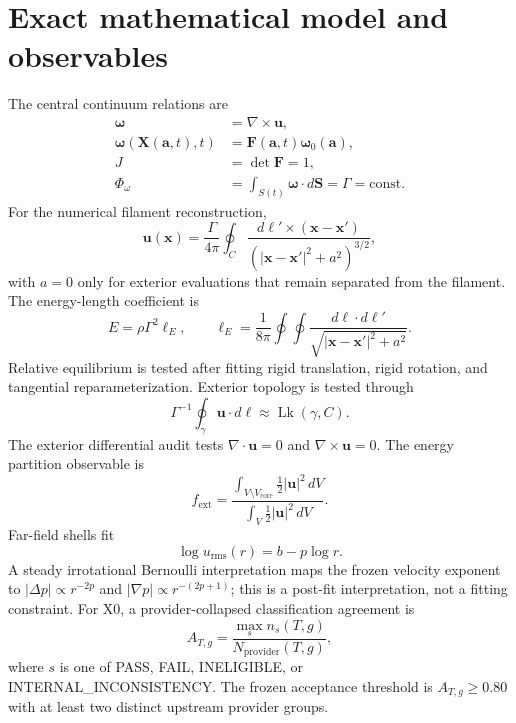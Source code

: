 \documentclass[11pt,a4paper]{article}
\newcommand{\vort}{\boldsymbol{\omega}}
\newcommand{\vel}{\mathbf{u}}
\newcommand{\Fmat}{\mathbf{F}}
\begin{document}
\section{Exact mathematical model and observables}
The central continuum relations are
\begin{align}
\vort &= \nabla\times\vel, \\
\vort(\mathbf{X}(\mathbf{a},t),t) &= \Fmat(\mathbf{a},t)\vort_0(\mathbf{a}), \\
J&=\det\Fmat=1, \\
\Phi_\omega&=\int_{S(t)}\vort\cdot d\mathbf{S}=\Gamma=\mathrm{const}. 
\end{align}
For the numerical filament reconstruction,
\begin{equation}
\vel(\mathbf{x})=\frac{\Gamma}{4\pi}\oint_C
\frac{d\boldsymbol{\ell}'\times(\mathbf{x}-\mathbf{x}')}{(|\mathbf{x}-\mathbf{x}'|^2+a^2)^{3/2}},
\end{equation}
with $a=0$ only for exterior evaluations that remain separated from the filament. The energy-length coefficient is
\begin{equation}
E=\rho\Gamma^2\ell_E,\qquad
\ell_E=\frac{1}{8\pi}\oint\!\oint
\frac{d\boldsymbol{\ell}\cdot d\boldsymbol{\ell}'}{\sqrt{|\mathbf{x}-\mathbf{x}'|^2+a^2}}.
\end{equation}
Relative equilibrium is tested after fitting rigid translation, rigid rotation, and tangential reparameterization. Exterior topology is tested through
\begin{equation}
\Gamma^{-1}\oint_\gamma\vel\cdot d\boldsymbol{\ell}\approx \operatorname{Lk}(\gamma,C).
\end{equation}
The exterior differential audit tests $\nabla\cdot\vel=0$ and $\nabla\times\vel=0$. The energy partition observable is
\begin{equation}
f_{\mathrm{ext}}=
\frac{\int_{V\setminus V_{\mathrm{core}}}\frac12|\vel|^2\,dV}
{\int_V\frac12|\vel|^2\,dV}.
\end{equation}
Far-field shells fit
\begin{equation}
\log u_{\mathrm{rms}}(r)=b-p\log r.
\end{equation}
A steady irrotational Bernoulli interpretation maps the frozen velocity exponent to $|\Delta p|\propto r^{-2p}$ and $|\nabla p|\propto r^{-(2p+1)}$; this is a post-fit interpretation, not a fitting constraint.
For X0, a provider-collapsed classification agreement is
\begin{equation}
A_{T,g}=\frac{\max_s n_s(T,g)}{N_{\mathrm{provider}}(T,g)},
\end{equation}
where $s$ is one of PASS, FAIL, INELIGIBLE, or INTERNAL\_INCONSISTENCY. The frozen acceptance threshold is $A_{T,g}\ge0.80$ with at least two distinct upstream provider groups.
\end{document}

